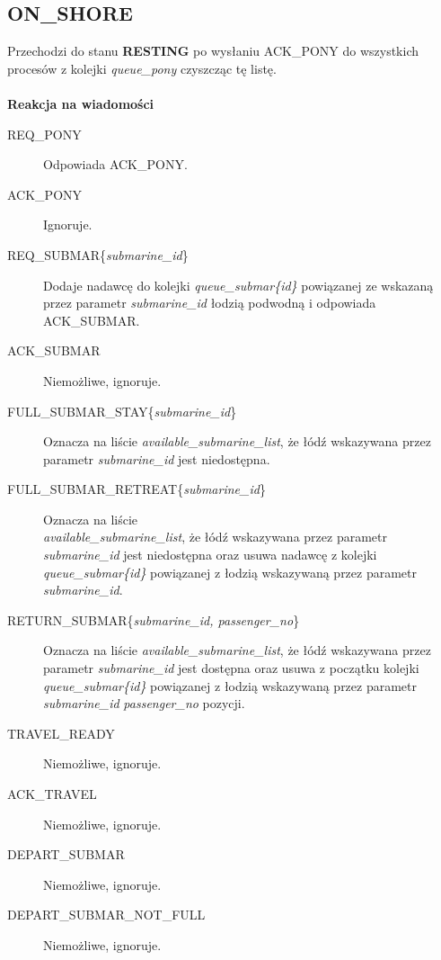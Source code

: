 \documentclass[a4paper]{article}
\begin{document}
\subsection{\textbf{ON\_SHORE}}
Przechodzi do stanu \textbf{RESTING} po wysłaniu ACK\_PONY do wszystkich procesów z kolejki \textit{queue\_pony} czyszcząc tę listę.
\\
\\
\textbf{Reakcja na wiadomości}
\begin{description}
    \item [REQ\_PONY] Odpowiada ACK\_PONY.
    \item [ACK\_PONY] Ignoruje.
    \item [REQ\_SUBMAR\{\textit{submarine\_id}\}] Dodaje nadawcę do kolejki \textit{queue\_submar\{id\}} powiązanej ze wskazaną przez parametr \textit{submarine\_id} łodzią podwodną i odpowiada ACK\_SUBMAR.
    \item [ACK\_SUBMAR] Niemożliwe, ignoruje.
    \item [FULL\_SUBMAR\_STAY\{\textit{submarine\_id}\}] Oznacza na liście \textit{available\_submarine\_list}, że łódź wskazywana przez parametr \textit{submarine\_id} jest niedostępna.
    \item [FULL\_SUBMAR\_RETREAT\{\textit{submarine\_id}\}] Oznacza na liście\\
     \textit{available\_submarine\_list}, że łódź wskazywana przez parametr \textit{submarine\_id} jest niedostępna oraz usuwa nadawcę z kolejki \textit{queue\_submar\{id\}} powiązanej z łodzią wskazywaną przez parametr \textit{submarine\_id}.
    \item [RETURN\_SUBMAR\{\textit{submarine\_id, passenger\_no}\}] Oznacza na liście \textit{available\_submarine\_list}, że łódź wskazywana przez parametr \textit{submarine\_id} jest dostępna
    oraz usuwa z początku kolejki \textit{queue\_submar\{id\}} powiązanej z łodzią wskazywaną przez parametr \textit{submarine\_id} \textit{passenger\_no} pozycji.
    \item [TRAVEL\_READY] Niemożliwe, ignoruje.
    \item [ACK\_TRAVEL] Niemożliwe, ignoruje.
    \item [DEPART\_SUBMAR] Niemożliwe, ignoruje.
    \item [DEPART\_SUBMAR\_NOT\_FULL] Niemożliwe, ignoruje.
\end{description}
\end{document}
